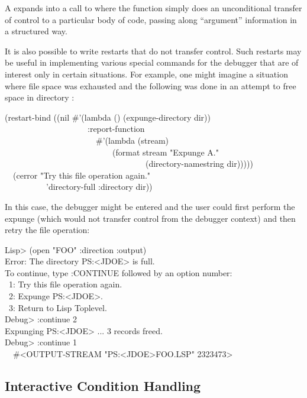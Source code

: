 A  expands into a call to  where the function
simply does an unconditional transfer of control to a particular body
of code, passing along ``argument'' information in a structured way.

It is also possible to write restarts that do not transfer control. Such
restarts may be useful in implementing various special commands for the
debugger that are of interest only in certain situations. For example,
one might imagine a situation where file space was exhausted and the
following was done in an attempt to free space in directory :
\begin{lisp}
(restart-bind ((nil \#'(lambda () (expunge-directory dir)) \\
~~~~~~~~~~~~~~~~~~~~:report-function \\
~~~~~~~~~~~~~~~~~~~~~~\#'(lambda (stream) \\
~~~~~~~~~~~~~~~~~~~~~~~~~~(format stream "Expunge {\Xtilde}A." \\
~~~~~~~~~~~~~~~~~~~~~~~~~~~~~~~~~~(directory-namestring dir))))) \\
~~(cerror "Try this file operation again." \\
~~~~~~~~~~'directory-full :directory dir))
\end{lisp}
In this case, the debugger might be entered and the user could first
perform the expunge (which would not transfer control from the debugger
context) and then retry the file operation:
\begin{lisp}
Lisp> (open "FOO" :direction :output) \\
Error: The directory PS:<JDOE> is full. \\
To continue, type :CONTINUE followed by an option number: \\
~1: Try this file operation again. \\
~2: Expunge PS:<JDOE>. \\
~3: Return to Lisp Toplevel. \\
Debug> :continue 2 \\
Expunging PS:<JDOE> ... 3 records freed. \\
Debug> :continue 1 \\
~\EV\ \#<OUTPUT-STREAM "PS:<JDOE>FOO.LSP" 2323473>
\end{lisp}

\subsection{Interactive Condition Handling}

